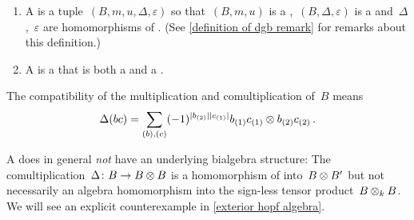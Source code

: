 \documentclass[a4paper,10pt,headings=standardclasses]{scrartcl}
\begin{document}
\begin{definition}
  \label{definition of dgb}
  \leavevmode
  \begin{enumerate}
    \item
      A  is a tuple~$(B, m, u, \Delta, \varepsilon)$ so that~$(B, m, u)$ is a {\dga},~$(B, \Delta, \varepsilon)$ is a {\dgc} and~$\Delta$,~$\varepsilon$ are homomorphisms of {\dgas}.
      (See \cref{definition of dgb remark} for remarks about this definition.)
    \item
      A  is a {\dgsub} that is both a {\dgi} and a {\dgci}.
  \end{enumerate}
\end{definition}

\begin{remark}
  The compatibility of the multiplication and comultiplication of~$B$ means
  \begin{gather*}
    \Delta(bc)
    =
    \sum_{(b), (c)}
    (-1)^{\lvert b_{(2)}\rvert \lvert c_{(1)}\rvert}
    b_{(1)} c_{(1)} \otimes b_{(2)} c_{(2)} \,.
  \end{gather*}
\end{remark}


\begin{warning}
  A {\dgb} does in general \emph{not} have an underlying bialgebra structure:
  The comultiplication~$\Delta \colon B \to B \otimes B$ is a homomorphism of {\dgas} into~$B \otimes B'$ but not necessarily an algebra homomorphism into the sign-less tensor product~$B \otimes_k B$.
  We will see an explicit counterexample in \cref{exterior hopf algebra}.
\end{warning}
\end{document}
